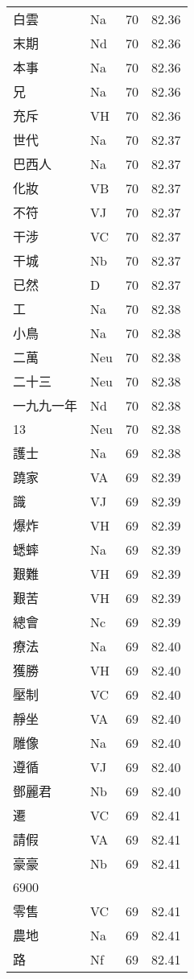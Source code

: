 \documentclass[twocolumn]{book}
\begin{document}
\begin{supertabular}{llrr}
白雲 & Na & 70 &  82.36\\
末期 & Nd & 70 &  82.36\\
本事 & Na & 70 &  82.36\\
兄 & Na & 70 &  82.36\\
充斥 & VH & 70 &  82.36\\
世代 & Na & 70 &  82.37\\
巴西人 & Na & 70 &  82.37\\
化妝 & VB & 70 &  82.37\\
不符 & VJ & 70 &  82.37\\
干涉 & VC & 70 &  82.37\\
干城 & Nb & 70 &  82.37\\
已然 & D & 70 &  82.37\\
工 & Na & 70 &  82.38\\
小鳥 & Na & 70 &  82.38\\
二萬 & Neu & 70 &  82.38\\
二十三 & Neu & 70 &  82.38\\
一九九一年 & Nd & 70 &  82.38\\
13 & Neu & 70 &  82.38\\
護士 & Na & 69 &  82.38\\
蹺家 & VA & 69 &  82.39\\
識 & VJ & 69 &  82.39\\
爆炸 & VH & 69 &  82.39\\
蟋蟀 & Na & 69 &  82.39\\
艱難 & VH & 69 &  82.39\\
艱苦 & VH & 69 &  82.39\\
總會 & Nc & 69 &  82.39\\
療法 & Na & 69 &  82.40\\
獲勝 & VH & 69 &  82.40\\
壓制 & VC & 69 &  82.40\\
靜坐 & VA & 69 &  82.40\\
雕像 & Na & 69 &  82.40\\
遵循 & VJ & 69 &  82.40\\
鄧麗君 & Nb & 69 &  82.40\\
遷 & VC & 69 &  82.41\\
請假 & VA & 69 &  82.41\\
豪豪 & Nb & 69 &  82.41\\
6900\\
零售 & VC & 69 &  82.41\\
農地 & Na & 69 &  82.41\\
路 & Nf & 69 &  82.41\\

\end{supertabular}
\end{document}
